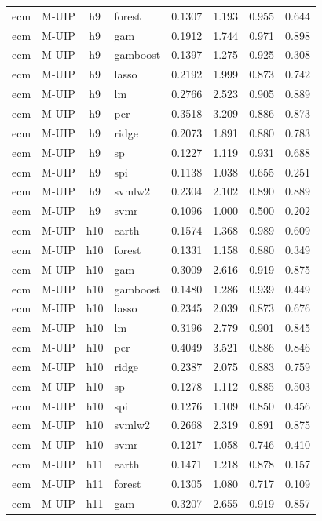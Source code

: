 \begin{ThreePartTable}
\begin{longtable}[t]{llclcccc}
ecm & M-UIP & h9 & forest & 0.1307 & 1.193 & 0.955 & 0.644\\
ecm & M-UIP & h9 & gam & 0.1912 & 1.744 & 0.971 & 0.898\\
ecm & M-UIP & h9 & gamboost & 0.1397 & 1.275 & 0.925 & 0.308\\
ecm & M-UIP & h9 & lasso & 0.2192 & 1.999 & 0.873 & 0.742\\
ecm & M-UIP & h9 & lm & 0.2766 & 2.523 & 0.905 & 0.889\\
ecm & M-UIP & h9 & pcr & 0.3518 & 3.209 & 0.886 & 0.873\\
ecm & M-UIP & h9 & ridge & 0.2073 & 1.891 & 0.880 & 0.783\\
ecm & M-UIP & h9 & sp & 0.1227 & 1.119 & 0.931 & 0.688\\
ecm & M-UIP & h9 & spi & 0.1138 & 1.038 & 0.655 & 0.251\\
ecm & M-UIP & h9 & svmlw2 & 0.2304 & 2.102 & 0.890 & 0.889\\
ecm & M-UIP & h9 & svmr & 0.1096 & 1.000 & 0.500 & 0.202\\
\addlinespace
ecm & M-UIP & h10 & earth & 0.1574 & 1.368 & 0.989 & 0.609\\
ecm & M-UIP & h10 & forest & 0.1331 & 1.158 & 0.880 & 0.349\\
ecm & M-UIP & h10 & gam & 0.3009 & 2.616 & 0.919 & 0.875\\
ecm & M-UIP & h10 & gamboost & 0.1480 & 1.286 & 0.939 & 0.449\\
ecm & M-UIP & h10 & lasso & 0.2345 & 2.039 & 0.873 & 0.676\\
ecm & M-UIP & h10 & lm & 0.3196 & 2.779 & 0.901 & 0.845\\
ecm & M-UIP & h10 & pcr & 0.4049 & 3.521 & 0.886 & 0.846\\
ecm & M-UIP & h10 & ridge & 0.2387 & 2.075 & 0.883 & 0.759\\
ecm & M-UIP & h10 & sp & 0.1278 & 1.112 & 0.885 & 0.503\\
ecm & M-UIP & h10 & spi & 0.1276 & 1.109 & 0.850 & 0.456\\
ecm & M-UIP & h10 & svmlw2 & 0.2668 & 2.319 & 0.891 & 0.875\\
ecm & M-UIP & h10 & svmr & 0.1217 & 1.058 & 0.746 & 0.410\\
\addlinespace
ecm & M-UIP & h11 & earth & 0.1471 & 1.218 & 0.878 & 0.157\\
ecm & M-UIP & h11 & forest & 0.1305 & 1.080 & 0.717 & 0.109\\
ecm & M-UIP & h11 & gam & 0.3207 & 2.655 & 0.919 & 0.857\\

\end{longtable}
\end{ThreePartTable}
